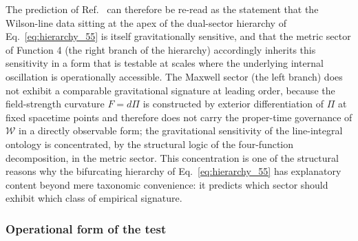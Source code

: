 \documentclass[%
 reprint, amsmath,amssymb, aps, prb, ]{revtex4-2}
\numberwithin{equation}{section}
\newcommand{\WL}{\mathcal{W}}
\begin{document}
The prediction of Ref.~\cite{hanamura22} can therefore be re-read as the statement that the Wilson-line data sitting at the apex of the dual-sector hierarchy of Eq.~\eqref{eq:hierarchy_55} is itself gravitationally sensitive, and that the metric sector of Function 4 (the right branch of the hierarchy) accordingly inherits this sensitivity in a form that is testable at scales where the underlying internal oscillation is operationally accessible. The Maxwell sector (the left branch) does not exhibit a comparable gravitational signature at leading order, because the field-strength curvature $F = d\Pi$ is constructed by exterior differentiation of $\Pi$ at fixed spacetime points and therefore does not carry the proper-time governance of $\WL$ in a directly observable form; the gravitational sensitivity of the line-integral ontology is concentrated, by the structural logic of the four-function decomposition, in the metric sector. This concentration is one of the structural reasons why the bifurcating hierarchy of Eq.~\eqref{eq:hierarchy_55} has explanatory content beyond mere taxonomic convenience: it predicts which sector should exhibit which class of empirical signature.

\subsubsection{Operational form of the test}
\end{document}

